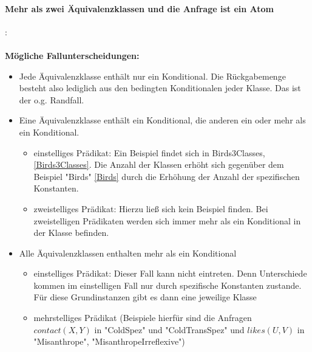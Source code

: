\documentclass[a4paper, 11pt]{book}
\begin{document}
\paragraph{ Mehr als zwei Äquivalenzklassen und die Anfrage ist ein Atom}: \label{Atom_mehrKlassen}\\
\\
\textbf{Mögliche Fallunterscheidungen:}
\begin{itemize}
	\item Jede Äquivalenzklasse enthält nur ein Konditional. Die Rückgabemenge besteht also lediglich aus den bedingten Konditionalen jeder Klasse. Das ist der o.g. Randfall.
	\item Eine Äquivalenzklasse enthält ein Konditional, die anderen ein oder mehr als ein Konditional. 
	\begin{itemize}
		\item einstelliges Prädikat: Ein Beispiel findet sich in Birds3Classes, \ref{Birds3Classes}. Die Anzahl der Klassen erhöht sich gegenüber dem Beispiel "{}Birds"{} \ref{Birds} durch die Erhöhung der Anzahl der spezifischen Konstanten.\\
		\item zweistelliges Prädikat: Hierzu ließ sich kein Beispiel finden. Bei zweistelligen Prädikaten werden sich immer mehr als ein Konditional in der Klasse befinden.
	\end{itemize}
	\item Alle Äquivalenzklassen enthalten mehr als ein Konditional
	\begin{itemize}
		\item einstelliges Prädikat: Dieser Fall kann nicht eintreten. Denn Unterschiede kommen im einstelligen Fall nur durch spezifische Konstanten zustande. Für diese Grundinstanzen gibt es dann eine jeweilige Klasse\\
		\item mehrstelliges Prädikat (Beispiele hierfür sind die Anfragen $ contact(X,Y) $ in "{}ColdSpez"{} und "{}ColdTransSpez"{} und $ likes(U,V) $ in "{}Misanthrope"{}, "{}MisanthropeIrreflexive"{}) \\
	\end{itemize}
\end{itemize}
\end{document}
